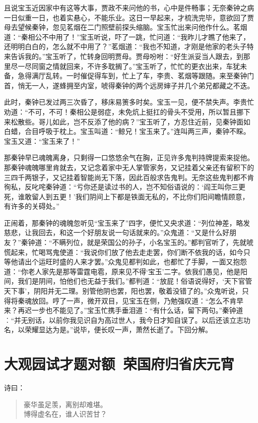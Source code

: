 \documentclass[12pt,oneside]{book}
\newenvironment{shici}{%
\begin{verse}%
\centering\large\hspace{12pt}}%
{\end{verse}}
\begin{document}
且说宝玉近因家中有这等大事，贾政不来问他的书，心中是件畅事；无奈秦钟之病一日似重一日，也着实悬心，不能乐业。这日一早起来，才梳洗完毕，意欲回了贾母去望候秦钟，忽见茗烟在二门照壁前探头缩脑。宝玉忙出来问他作什么。茗烟道：“秦相公不中用了！”宝玉听说，吓了一跳，忙问道：“我昨儿才瞧了他来了，还明明白白的，怎么就不中用了？”茗烟道：“我也不知道，才刚是他家的老头子特来告诉我的。”宝玉听了，忙转身回明贾母。贾母吩咐：“好生派妥当人跟去，到那里尽一尽同窗之情就回来，不许多耽搁了。”宝玉听了，忙忙的更衣出来，车犹未备，急得满厅乱转。一时催促得车到，忙上了车，李贵、茗烟等跟随。来至秦钟门首，悄无一人，遂蜂拥至内室，唬得秦钟的两个远房婶子并几个弟兄都藏之不迭。

此时，秦钟已发过两三次昏了，移床易箦多时矣。宝玉一见，便不禁失声。李贵忙劝道：“不可，不可！秦相公是弱症，未免炕上挺扛的骨头不受用，所以暂且挪下来松散些。哥儿如此，岂不反添了他的病？”宝玉听了，方忍住近前，见秦钟面如白蜡，合目呼吸于枕上。宝玉叫道：“鲸兄！宝玉来了。”连叫两三声，秦钟不睬。宝玉又道：“宝玉来了！”

那秦钟早已魂魄离身，只剩得一口悠悠余气在胸，正见许多鬼判持牌提索来捉他。那秦钟魂魄哪里肯就去，又记念着家中无人掌管家务，又记挂着父亲还有留积下的三四千两银子，又记挂着智能尚无下落，因此百般求告鬼判。无奈这些鬼判都不肯徇私，反叱咤秦钟道：“亏你还是读过书的人，岂不知俗语说的：‘阎王叫你三更死，谁敢留人到五更！’我们阴间上下都是铁面无私的，不比你们阳间瞻情顾意，有许多的关碍处。”

正闹着，那秦钟的魂魄忽听见“宝玉来了”四字，便忙又央求道：“列位神差，略发慈悲，让我回去，和这一个好朋友说一句话就来的。”众鬼道：“又是什么好朋友？”秦钟道：“不瞒列位，就是荣国公的孙子，小名宝玉的。”都判官听了，先就唬慌起来，忙喝骂鬼使道：“我说你们放了他去走走罢，你们断不依我的话，如今只等他请出个运旺时盛的人来才罢。”众鬼见都判如此，也都忙了手脚，一面又抱怨道：“你老人家先是那等雷霆电雹，原来见不得‘宝玉’二字。依我们愚见，他是阳间，我们是阴间，怕他们也无益于我们。”都判道：“放屁！俗语说得好，‘天下官管天下事’，阴阳并无二理。别管他阴也罢，阳也罢，敬着没错了的。”众鬼听说，只得将秦魂放回。哼了一声，微开双目，见宝玉在侧，乃勉强叹道：“怎么不肯早来？再迟一步也不能见了。”宝玉忙携手垂泪道：“有什么话，留下两句。”秦钟道︰“并无别话，以前你我见识自为高过世人，我今日才知自误了。以后还该立志功名，以荣耀显达为是。”说毕，便长叹一声，萧然长逝了。下回分解。


 
\chapter{大观园试才题对额~荣国府归省庆元宵}
诗曰：
\begin{shici}
豪华虽足羡，离别却难堪。\\
博得虚名在，谁人识苦甘？
\end{shici}
\end{document}
